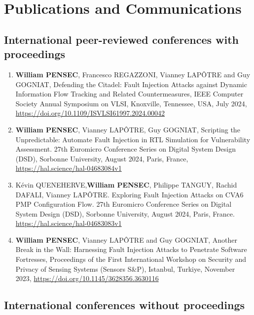 \chapter{Publications and Communications}
\label{chapter:publi}
\section{International peer-reviewed conferences with proceedings}

\begin{enumerate}
    \item \textbf{William PENSEC}, Francesco REGAZZONI, Vianney LAPÔTRE and Guy GOGNIAT, Defending the Citadel: Fault Injection Attacks against Dynamic Information Flow Tracking and Related Countermeasures, IEEE Computer Society Annual Symposium on VLSI, Knoxville, Tennessee, USA, July 2024, \url{https://doi.org/10.1109/ISVLSI61997.2024.00042}
    \item\textbf{William PENSEC}, Vianney LAPÔTRE, Guy GOGNIAT, Scripting the Unpredictable: Automate Fault Injection in RTL Simulation for Vulnerability Assessment. 27th Euromicro Conference Series on Digital System Design (DSD), Sorbonne University, August 2024, Paris, France, \url{https://hal.science/hal-04683084v1}
    \item Kévin QUENEHERVE,\textbf{William PENSEC}, Philippe TANGUY, Rachid DAFALI, Vianney LAPÔTRE. Exploring Fault Injection Attacks on CVA6 PMP Configuration Flow. 27th Euromicro Conference Series on Digital System Design (DSD), Sorbonne University, August 2024, Paris, France. \url{https://hal.science/hal-04683083v1}
    \item\textbf{William PENSEC}, Vianney LAPÔTRE and Guy GOGNIAT, Another Break in the Wall: Harnessing Fault Injection Attacks to Penetrate Software Fortresses, Proceedings of the First International Workshop on Security and Privacy of Sensing Systems (Sensors S\&P), Istanbul, Turkiye, November 2023, \url{https://doi.org/10.1145/3628356.3630116}
\end{enumerate}
\section{International conferences without proceedings}

